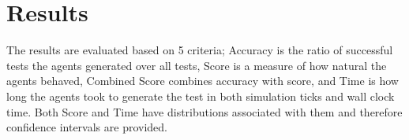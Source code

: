 \documentclass[letterpaper, 10 pt, journal, twoside]{IEEEtran}
\begin{document}
%








\section{Results}\label{s:results}
The results are evaluated based on 5 criteria; Accuracy is the ratio of successful tests the agents generated over all tests, Score is a measure of how natural the agents behaved, Combined Score combines accuracy with score, and Time is how long the agents took to generate the test in both simulation ticks and wall clock time. Both Score and Time have distributions associated with them and therefore confidence intervals are provided.



\end{document}
